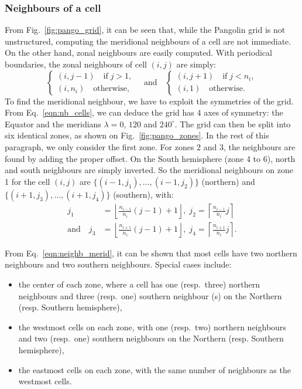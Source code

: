 \subsubsection{Neighbours of a cell}
From Fig.~\ref{fig:pango_grid}, it can be seen that, while the Pangolin grid is not
unstructured, computing the meridional neighbours of a cell are not immediate.
On the other hand, zonal neighbours are easily computed. With periodical
boundaries, the zonal neighbours of cell $(i,j)$ are simply:
\begin{equation}
  \begin{cases}
    (i,j-1) \quad \text{if} \; j > 1, \\
    (i, n_i)  \quad \text{otherwise,}
  \end{cases}
  \quad \text{and} \quad
  \begin{cases}
    (i,j+1) \quad \text{if} \; j < n_i, \\
    (i,1)  \quad \text{otherwise.}
  \end{cases}
\end{equation}
To find the meridional neighbour, we have to exploit the symmetries of the grid.
From Eq.~\eqref{eqn:nb_cells}, we can deduce the grid has 4 axes of symmetry:
the Equator and the meridians $\lambda=0$, $120$ and $240^\circ$. The grid can
then be split into six identical zones, as shown on Fig.~\ref{fig:pango_zones}.
In the rest of this paragraph, we only consider the first zone.  For zones 2 and
3, the neighbours are found by adding the proper offset. On the South hemisphere
(zone 4 to 6), north and south neighbours are simply inverted. So the meridional
neighbours on zone 1 for the cell $(i,j)$ are
$\big\{(i-1,j_1), \ldots, (i-1, j_2)\big\}$ (northern) and 
$\big\{(i+1,j_3), \ldots, (i+1, j_4)\big\}$ (southern), with:
\begin{equation}
  \begin{aligned}
    j_1 &= \left\lfloor \frac{n_{i-1}}{n_i}(j-1)+1\right\rfloor, \;
    j_2 = \left\lceil \frac{n_{i-1}}{n_i}j\right\rceil \\
    \text{and} \quad 
    j_3 &= \left\lfloor \frac{n_{i+1}}{n_i}(j-1)+1\right\rfloor, \;
    j_4 = \left\lceil \frac{n_{i+1}}{n_i}j\right\rceil.
\label{eqn:neighb_merid}
  \end{aligned}
\end{equation}

From Eq.~\eqref{eqn:neighb_merid}, it can be shown that most cells have two
northern neighbours and two southern neighbours. Special cases include:
\begin{itemize}
  \item the center of each zone, where a cell has one (resp.~three) northern
    neighbours and three (resp.~one) southern neighbour (s) on the Northern (resp. Southern
    hemisphere),
  \item the westmost cells on each zone, with one (resp.~two) northern neighbours
    and two (resp.~one) southern neighbours on the Northern (resp. Southern
    hemisphere),
  \item the eastmost cells on each zone, with the same number of neighbours as
    the westmost cells.
\end{itemize}

